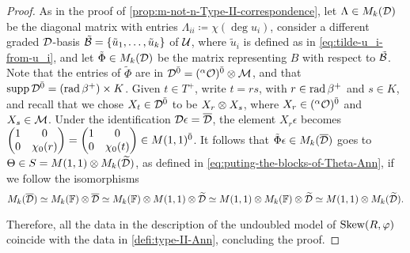 \begin{proof}
    As in the proof of \cref{prop:m-not-n-Type-II-correspondence}, let $\Lambda \in M_k(\mathcal{D})$ be the diagonal matrix with entries $\Lambda_{ii} \coloneqq \chi(\deg u_i)$, consider a different graded $\mathcal{D}$-basis $\tilde {\mathcal B} = \{ \tilde u_1, \ldots, \tilde u_k \}$ of $\mathcal U$, where $\tilde u_i$ is defined as in \cref{eq:tilde-u_i-from-u_i}, and let $\tilde \Phi \in M_k(\mathcal{D})$ be the matrix representing $B$ with respect to $\tilde {\mathcal B}$. 
    Note that the entries of $\tilde\Phi$ are in $\mathcal{D}^{\bar0} = \mathcal ({}^\alpha\mathcal O)^{\bar0} \otimes \mathcal M$, and that $\operatorname{supp} \mathcal{D}^{\bar0} = (\operatorname{rad} \beta^+) \times K$. 
    Given $t \in T^+$, write $t= rs$, with $r\in \operatorname{rad} \beta^+$ and $s\in K$, and recall that we chose $X_t \in \mathcal{D}^{\bar0}$ to be $X_r \otimes X_s$, where $X_r \in ({}^\alpha\mathcal O)^{\bar0}$ and $X_s \in \mathcal M$. 
    Under the identification $\D\epsilon = \barr \D$, the element $X_r\epsilon$ becomes $
    \begin{pmatrix}
        1 & 0\\
        0 & \chi_0(r)
    \end{pmatrix} = 
    \begin{pmatrix}
        1 & 0\\
        0 & \chi_0(t)
    \end{pmatrix} \in M(1,1)^{\bar0}$. 
    It follows that $\tilde \Phi \epsilon \in M_k(\barr \D)$ goes to $\Theta \in S = M(1,1)\otimes M_k(\widetilde {\mathcal{D}})$, as defined in \cref{eq:puting-the-blocks-of-Theta-Ann}, if we follow the isomorphisms
    \[\label{eq:chain-of-isos-Ann}
        M_k(\barr \D) \iso
        M_k(\FF)\tensor \barr \D \iso
        M_k(\FF) \tensor M(1,1) \tensor \widetilde \D \iso
        M(1,1) \tensor M_k(\FF) \tensor \widetilde \D \iso
        M(1,1)\tensor M_k(\widetilde \D). 
    \]
    
    Therefore, all the data in the description of the undoubled model of $\operatorname{Skew}(R, \varphi)$ coincide with the data in \cref{defi:type-II-Ann}, concluding the proof.
\end{proof}




